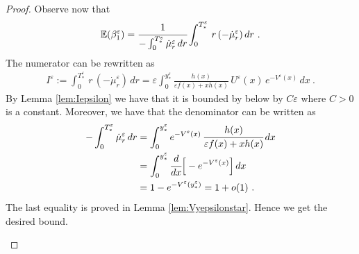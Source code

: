 \documentclass[reqno, 12pt, a4paper]{amsart}
\theoremstyle{plain}
\theoremstyle{definition}
\begin{document}
\begin{proof}
Observe now that 
\begin{equation}
\begin{split}
\mathbb E (\beta_1^\varepsilon)= \cfrac{1}{-\int_0^{T_*^\varepsilon}  \dot{\mu}_r^\varepsilon \, dr } \int_0^{T^\varepsilon_*}  \, r \,  (-\dot{\mu}_r^\varepsilon)  \, dr \ .
\end{split}
\end{equation}
The numerator can be rewritten as
\begin{equation}
\begin{split}
I^\varepsilon := \int_0^{T^\varepsilon_*}  \, r \,  (-\dot{\mu}_r^\varepsilon)  \, dr  =  \varepsilon  \int_0^{y_*^\varepsilon} \frac{h(x) }{\varepsilon f(x) + xh(x)} \, U^\varepsilon (x) \, e^{-V^\varepsilon (x)} \, dx  \ .
\end{split}
\end{equation}
By Lemma \ref{lem:Iepsilon} we have that it is bounded by below by $C \varepsilon$ where $C>0$ is a constant. Moreover, we have that the denominator can be written as
\begin{equation}
\begin{split}
-\int_0^{T_*^\varepsilon}  \dot{\mu}_r^\varepsilon \, dr &= \int_0^{y_*^\varepsilon} e^{-V^\varepsilon (x)} \, \cfrac{h(x)}{\varepsilon f(x) +x h(x)} \,  dx \\
&= \int_0^{y_*^\varepsilon} \cfrac{d}{dx} \Big[ - e^{-V^\varepsilon (x)} \Big] \, dx \\
&=1- e^{-V^\varepsilon (y_*^\varepsilon)} =1 + o(1) \ .
\end{split}
\end{equation}
The last equality is proved in Lemma \ref{lem:Vyepsilonstar}. Hence we get the desired bound. 


\begin{figure}[htbp]
    \centering
    \label{fig:trajectory-tightness}



\end{figure}
\end{proof}
\end{document}
